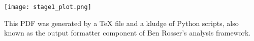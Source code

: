 \documentclass{article}
\begin{document}
{
	\small
	
}

\begin{center}
  \texttt{[image: stage1\_plot.png]}
\end{center}

This PDF was generated by a TeX file and a kludge of Python scripts, also known
as the output formatter component of Ben Rosser's analysis framework.

\clearpage
\end{document}
